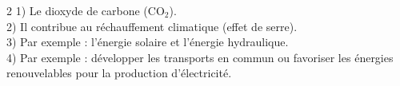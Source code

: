 \begin{multicols}{2}
1) Le dioxyde de carbone ($\mathrm{CO_2}$).\\
2) Il contribue au réchauffement climatique (effet de serre).\\
3) Par exemple : l'énergie solaire et l'énergie hydraulique.\\
4) Par exemple : développer les transports en commun ou favoriser les énergies
renouvelables pour la production d'électricité.

\end{multicols}
\exercicesBanner
